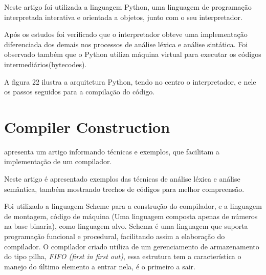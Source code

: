 \documentclass[12pt,oneside,a4paper,chapter=TITLE,section=TITLE,sumario=tradicional]{abntex2}
\begin{document}
Neste artigo foi utilizada a linguagem Python, uma linguagem de programação interpretada interativa e orientada a objetos, junto com o seu interpretador.

Após os estudos foi verificado que o interpretador obteve uma implementação diferenciada dos demais nos processos de análise léxica e análise sintática. Foi observado também que o Python utiliza máquina virtual para executar os códigos intermediários(bytecodes).

A figura 22 ilustra a arquitetura Python, tendo no centro o interpretador, e nele os passos seguidos para a compilação do código.

\begin{figure}[htb]
\end{figure}

\section{ Compiler Construction}
\label{sec:compiler-construction}

\cite{aastha2013} apresenta um artigo informando técnicas e exemplos, que facilitam a implementação de um compilador. 

Neste artigo é apresentado exemplos das técnicas de análise léxica e análise semântica, também mostrando trechos de códigos para melhor compreensão.

Foi utilizado a linguagem Scheme para a construção do compilador, e a linguagem de montagem, código de máquina (Uma linguagem composta apenas de números na base binaria), como linguagem alvo. Schema é uma linguagem que suporta programação funcional e procedural, facilitando assim a elaboração do compilador. O compilador criado utiliza de um gerenciamento de armazenamento do tipo pilha, \textit{FIFO (first in first out)}, essa estrutura tem a característica o manejo do último elemento a entrar nela, é o primeiro a sair.
\end{document}
